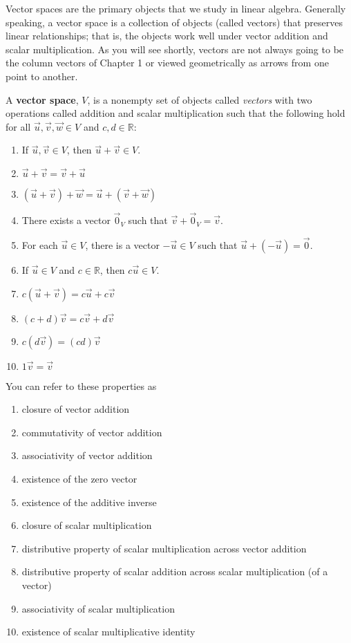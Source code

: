 Vector spaces are the primary objects that we study in linear algebra. Generally speaking, a vector space is a collection of objects (called vectors) that preserves linear relationships; that is, the objects work well under vector addition and scalar multiplication. As you will see shortly, vectors are not always going to be the column vectors of Chapter 1 or viewed geometrically as arrows from one point to another.
\begin{annotation}
\end{annotation}
\begin{definition}
A \textbf{vector space}, $V$, is a nonempty set of objects called \emph{vectors} with two operations called addition and scalar multiplication such that the following hold for all $\vec{u}, \vec{v}, \vec{w} \in V$ and $c,d \in \mathbb{R}$:
\begin{enumerate}
\item If $\vec{u}, \vec{v} \in V$, then $\vec{u}+\vec{v}\in V$.
\item $\vec{u}+\vec{v}=\vec{v}+\vec{u}$
\item $(\vec{u}+\vec{v})+\vec{w}=\vec{u}+(\vec{v}+\vec{w})$
\item There exists a vector $\vec{0}_V$ such that $\vec{v}+\vec{0}_V=\vec{v}$.
\item For each $\vec{u} \in V$, there is a vector $-\vec{u} \in V$ such that $\vec{u} + (-\vec{u})=\vec{0}$.
\item If $\vec{u} \in V$ and $c \in \mathbb{R}$, then $c\vec{u} \in V$.
\item $c(\vec{u}+\vec{v})=c\vec{u}+c\vec{v}$
\item $(c+d)\vec{v}=c\vec{v}+d\vec{v}$
\item $c(d\vec{v})=(cd)\vec{v}$
\item $1 \vec{v}=\vec{v}$
\end{enumerate}
You can refer to these properties as
\begin{enumerate}
\item closure of vector addition
\item commutativity of vector addition
\item associativity of vector addition
\item existence of the zero vector
\item existence of the additive inverse
\item closure of scalar multiplication
\item distributive property of scalar multiplication across vector addition
\item distributive property of scalar addition across scalar multiplication (of a vector)
\item associativity of scalar multiplication
\item existence of scalar multiplicative identity
\end{enumerate}
\end{definition}
